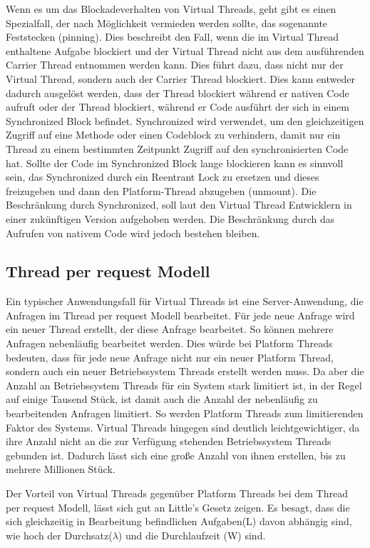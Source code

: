 \documentclass[fontsize=12pt,paper=a4,twoside=semi,parskip=half-,headsepline,headinclude]{scrreprt}
\begin{document}
Wenn es um das Blockadeverhalten von Virtual Threads, geht gibt es einen Spezialfall, der nach Möglichkeit vermieden werden sollte, das sogenannte Feststecken (pinning). Dies beschreibt den Fall, wenn die im Virtual Thread enthaltene Aufgabe blockiert und der Virtual Thread nicht aus dem ausführenden Carrier Thread entnommen werden kann. Dies führt dazu, dass nicht nur der Virtual Thread, sondern auch der Carrier Thread blockiert. Dies kann entweder dadurch ausgelöst werden, dass der Thread blockiert während er nativen Code aufruft oder der Thread blockiert, während er Code ausführt der sich in einem Synchronized Block befindet. Synchronized wird verwendet, um den gleichzeitigen Zugriff auf eine Methode oder einen Codeblock zu verhindern, damit nur ein Thread zu einem bestimmten Zeitpunkt Zugriff auf den synchronisierten Code hat. Sollte der Code im Synchronized Block lange blockieren kann es sinnvoll sein, das Synchronized durch ein Reentrant Lock zu ersetzen und dieses freizugeben und dann den Platform-Thread abzugeben (unmount). Die Beschränkung durch Synchronized, soll laut den Virtual Thread Entwicklern in einer zukünftigen Version aufgehoben werden.\cite{Chilano2024} Die Beschränkung durch das Aufrufen von nativem Code wird jedoch bestehen bleiben.\cite{Bateman2024}

\subsection{Thread per request Modell}

Ein typischer Anwendungsfall für Virtual Threads ist eine Server-Anwendung, die Anfragen im Thread per request Modell bearbeitet. Für jede neue Anfrage wird ein neuer Thread erstellt, der diese Anfrage bearbeitet. So können mehrere Anfragen nebenläufig bearbeitet werden. Dies würde bei Platform Threads bedeuten, dass für jede neue Anfrage nicht nur ein neuer Platform Thread, sondern auch ein neuer Betriebssystem Threads erstellt werden muss. Da aber die Anzahl an Betriebssystem Threads für ein System stark limitiert ist, in der Regel auf einige Tausend Stück, ist damit auch die Anzahl der nebenläufig zu bearbeitenden Anfragen limitiert. So werden Platform Threads zum limitierenden Faktor des Systems. Virtual Threads hingegen sind deutlich leichtgewichtiger, da ihre Anzahl nicht an die zur Verfügung stehenden Betriebssystem Threads gebunden ist. Dadurch lässt sich eine große Anzahl von ihnen erstellen, bis zu mehrere Millionen Stück.

Der Vorteil von Virtual Threads gegenüber Platform Threads bei dem Thread per request Modell, lässt sich gut an Little's Gesetz zeigen. Es besagt, dass die sich gleichzeitig in Bearbeitung befindlichen Aufgaben(L) davon abhängig sind, wie hoch der Durchsatz($\lambda$) und die Durchlaufzeit (W) sind.\cite{Little1961}
\end{document}
